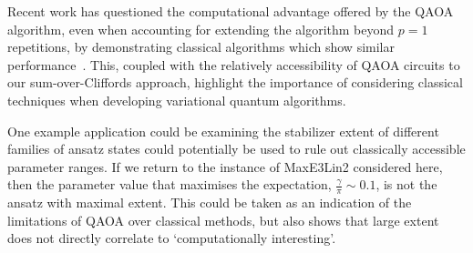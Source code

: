 Recent work has questioned the computational advantage offered by the QAOA algorithm, even when accounting for extending the algorithm beyond $p=1$ repetitions, by demonstrating classical algorithms which show similar performance~\cite{Hastings2019}. This, coupled with the relatively accessibility of QAOA circuits to our sum-over-Cliffords approach, highlight the importance of considering classical techniques when developing variational quantum algorithms.\par
One example application could be examining the stabilizer extent of different families of ansatz states could potentially be used to rule out classically accessible parameter ranges. If we return to the instance of MaxE3Lin2 considered here, then the parameter value that maximises the expectation, $\frac{\gamma}{\pi}\sim 0.1$, is not the ansatz with maximal extent. This could be taken as an indication of the limitations of QAOA over classical methods, but also shows that large extent does not directly correlate to `computationally interesting'.
